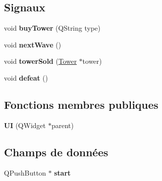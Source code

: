 \subsection*{Signaux}
\begin{DoxyCompactItemize}
\item 
\hypertarget{classUI_aff34760681ad834d325122691afc8454}{
void {\bfseries buyTower} (QString type)}
\label{classUI_aff34760681ad834d325122691afc8454}

\item 
\hypertarget{classUI_a63ad3c5f5b04203406c224ed01f50ddb}{
void {\bfseries nextWave} ()}
\label{classUI_a63ad3c5f5b04203406c224ed01f50ddb}

\item 
\hypertarget{classUI_a9c3ac46b4d04af5455a74f1034b44f26}{
void {\bfseries towerSold} (\hyperlink{classTower}{Tower} $\ast$tower)}
\label{classUI_a9c3ac46b4d04af5455a74f1034b44f26}

\item 
\hypertarget{classUI_a6d4de01a54d50dfeb43e2b9d9af81dda}{
void {\bfseries defeat} ()}
\label{classUI_a6d4de01a54d50dfeb43e2b9d9af81dda}

\end{DoxyCompactItemize}
\subsection*{Fonctions membres publiques}
\begin{DoxyCompactItemize}
\item 
\hypertarget{classUI_a983ff4bdfc1543f6ea015c21526d70b6}{
{\bfseries UI} (QWidget $\ast$parent)}
\label{classUI_a983ff4bdfc1543f6ea015c21526d70b6}

\end{DoxyCompactItemize}
\subsection*{Champs de données}
\begin{DoxyCompactItemize}
\item 
\hypertarget{classUI_a02df204852b5bbb75015490337b1da5f}{
QPushButton $\ast$ {\bfseries start}}
\label{classUI_a02df204852b5bbb75015490337b1da5f}

\end{DoxyCompactItemize}
